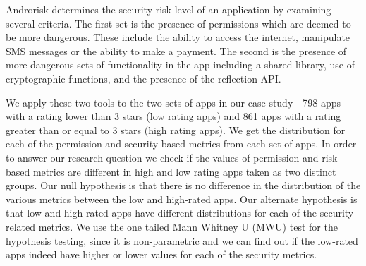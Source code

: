 Androrisk determines the security risk level of an application by examining several criteria. The first set is the presence of permissions which are deemed to be more dangerous. These include the ability to access the internet, manipulate SMS messages or the ability to make a payment. The second is the presence of more dangerous sets of functionality in the app including a shared library, use of cryptographic functions, and the presence of the reflection API.

We apply these two tools to the two sets of apps in our case study - 798 apps with a rating lower than 3 stars (low rating apps) and 861 apps with a rating greater than or equal to 3 stars (high rating apps). We get the distribution for each of the permission and security based metrics from each set of apps. In order to answer our research question we check if the values of permission and risk based metrics are different in high and low rating apps taken as two distinct groups. Our null hypothesis is that there is no difference in the distribution of the various metrics between the low and high-rated apps. Our alternate hypothesis is that low and high-rated apps have different distributions for each of the security related metrics. We use the one tailed Mann Whitney U (MWU) test for the hypothesis testing, since it is non-parametric and we can find out if the low-rated apps indeed have higher or lower values for each of the security metrics.

